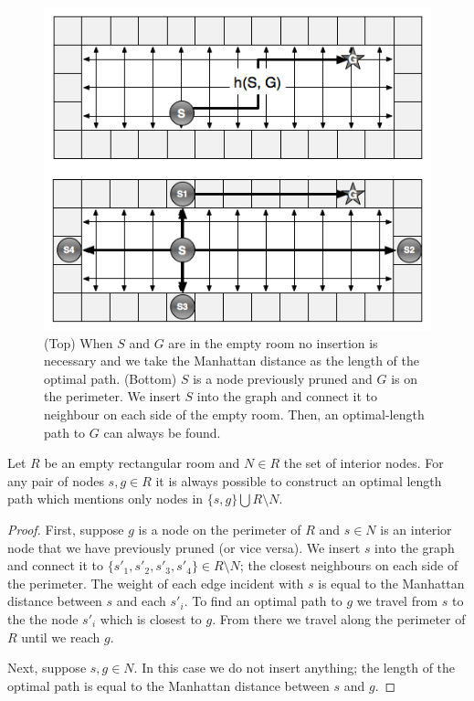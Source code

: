 \begin{figure}[t]
	\label{fig-roomtraversal}
	\vspace{-4pt}
       \begin{center}
           \includegraphics[scale=0.50, trim = 10mm 10mm 10mm 0mm]{diagrams/roomtraversal.png}
       \end{center}
	\vspace{-3pt}
       \caption{(Top) When $S$ and $G$ are in the empty room no insertion is necessary and we take the 
				Manhattan distance as the length of the optimal path.
				(Bottom) $S$ is a node previously pruned and $G$ is on the perimeter.
				We insert $S$ into the graph and connect it to neighbour on each side of the empty room.
				Then, an optimal-length path to $G$ can always be found.}
       \label{fig-ohacontrast}
	\vspace{-15pt}
\end{figure}

\begin{lemma}
\label{thm-insertion}
Let $R$ be an empty rectangular room and $N \in R$ the set of interior nodes.
For any pair of nodes $s, g \in R$ it is always possible to construct an optimal
length path which mentions only nodes in $\lbrace s, g \rbrace \bigcup  R \setminus N$.
\end{lemma}
\begin{proof}
First, suppose $g$ is a node on the perimeter of $R$ and $s \in N$ is an interior node that we 
have previously pruned (or vice versa).
We insert $s$ into the graph and connect it to 
$\lbrace s'_{1}, s'_{2}, s'_{3}, s'_{4} \rbrace \in R \setminus N$; the closest neighbours on 
each side of the perimeter.
The weight of each edge incident with $s$ is equal to the Manhattan distance between
$s$ and each $s'_{i}$.
To find an optimal path to $g$ we travel from $s$ to the the node $s'_{i}$ which is closest
to $g$. 
From there we travel along the perimeter of $R$ until we reach $g$.
\par
Next, suppose $s, g \in N$. 
In this case we do not insert anything; the length of the optimal path is equal
to the Manhattan distance between $s$ and $g$.
\end{proof}

